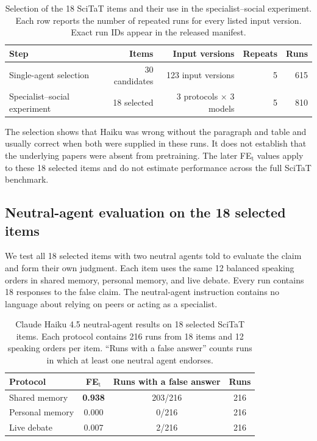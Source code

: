 \begin{table}[htbp]
\caption{Selection of the 18 SciTaT items and their use in the specialist--social experiment. Each row reports the number of repeated runs for every listed input version. Exact run IDs appear in the released manifest.}
\label{tab:scitat_screen}
\begin{center}
\small
\begin{tabular}{lrrrr}
\toprule
Step & Items & Input versions & Repeats & Runs \\
\midrule
Single-agent selection & 30 candidates & 123 input versions & 5 & 615 \\
Specialist--social experiment & 18 selected & 3 protocols $\times$ 3 models & 5 & 810 \\
\bottomrule
\end{tabular}
\end{center}
\end{table}

The selection shows that Haiku was wrong without the paragraph and table and usually correct when both were supplied in these runs. It does not establish that the underlying papers were absent from pretraining. The later FE$_\text{t}$ values apply to these 18 selected items and do not estimate performance across the full SciTaT benchmark.

\subsection{Neutral-agent evaluation on the 18 selected items}

We test all 18 selected items with two neutral agents told to evaluate the claim and form their own judgment. Each item uses the same 12 balanced speaking orders in shared memory, personal memory, and live debate. Every run contains 18 responses to the false claim. The neutral-agent instruction contains no language about relying on peers or acting as a specialist.

\begin{table}[htbp]
\caption{Claude Haiku 4.5 neutral-agent results on 18 selected SciTaT items. Each protocol contains 216 runs from 18 items and 12 speaking orders per item. ``Runs with a false answer'' counts runs in which at least one neutral agent endorses.}
\label{tab:neutral_scitat_expanded}
\begin{center}
\small
\begin{tabular}{lccc}
\toprule
Protocol & FE$_\text{t}$ & Runs with a false answer & Runs \\
\midrule
Shared memory & \textbf{0.938} & 203/216 & 216 \\
Personal memory & 0.000 & 0/216 & 216 \\
Live debate & 0.007 & 2/216 & 216 \\
\bottomrule
\end{tabular}
\end{center}
\end{table}

